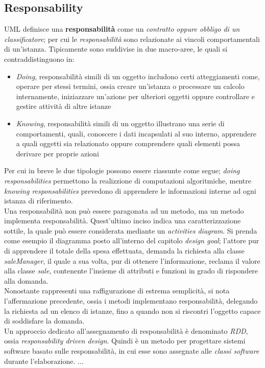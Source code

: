 \documentclass{article}
\begin{document}
\subsection*{Responsability}
\large
UML definisce una \textbf{responsabilità} come un \textit{contratto oppure obbligo di un classificatore}; per cui le \textit{responsabilità} sono relazionate ai vincoli comportamentali di un'istanza. Tipicamente sono suddivise in due macro-aree, le quali si contraddistinguono in:
\begin{itemize}[label={-}]
    \itemsep0em
    \item \textit{Doing}, responsabilità simili di un oggetto includono certi atteggiamenti come, operare per stessi termini, ossia creare un'istanza o processare un calcolo internamente, iniziazzare un'azione per ulteriori oggetti oppure controllare e gestire attività di altre istanze
    \item \textit{Knowing}, responsabilità simili di un oggetto illustrano una serie di comportamenti, quali, conoscere i dati incapsulati al suo interno, apprendere a quali oggetti sia relazionato oppure comprendere quali elementi possa derivare per proprie azioni
\end{itemize}
Per cui in breve le due tipologie possono essere riassunte come segue; \textit{doing responsabilities} permettono la realizzione di computazioni algoritmiche, mentre \textit{knowing responsabilities} prevedono di apprendere le informazioni interne ad ogni istanza di riferimento.\vspace*{14pt}\\
Una responsabilità non può essere paragonata ad un metodo, ma un metodo implementa responsabilità. Quest'ultimo inciso indica una caratterizzazione sottile, la quale può essere considerata mediante un \textit{activities diagram}. Si prenda come esempio il diagramma posto all'interno del capitolo \textit{design goal}; l'attore pur di apprendere il totale della spesa effettuata, demanda la richiesta alla classe \textit{saleManager}, il quale a sua volta, pur di ottenere l'informazione, reclama il valore alla classe \textit{sale}, contenente l'insieme di attributi e funzioni in grado di rispondere alla domanda.\vspace*{14pt}\\
Nonostante rappresenti una raffigurazione di estrema semplicità, si nota l'affermazione precedente, ossia i metodi implementano responsabilità, delegando la richiesta ad un elenco di istanze, fino a quando non si riscontri l'oggetto capace di soddisfare la domanda.\vspace*{14pt}\\
Un approccio dedicato all'assegnamento di responsabilità è denominato \textit{RDD}, ossia \textit{responsability driven design}. Quindi è un metodo per progettare sistemi software basato sulle responsabilità, in cui esse sono assegnate alle \textit{classi software} durante l'elaborazione. ...
\end{document}
